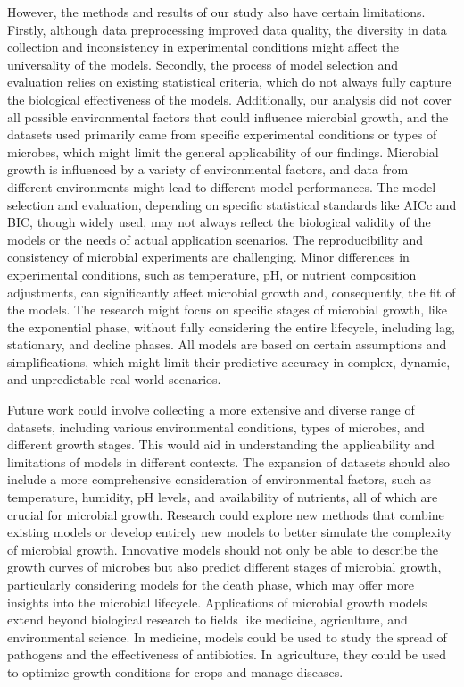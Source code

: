 \documentclass[11pt]{article}
\begin{document}
\begin{linenumbers}
However, the methods and results of our study also have certain limitations. Firstly, although data preprocessing improved data quality, the diversity in data collection and inconsistency in experimental conditions might affect the universality of the models. Secondly, the process of model selection and evaluation relies on existing statistical criteria, which do not always fully capture the biological effectiveness of the models. Additionally, our analysis did not cover all possible environmental factors that could influence microbial growth, and the datasets used primarily came from specific experimental conditions or types of microbes, which might limit the general applicability of our findings. Microbial growth is influenced by a variety of environmental factors, and data from different environments might lead to different model performances. The model selection and evaluation, depending on specific statistical standards like AICc and BIC, though widely used, may not always reflect the biological validity of the models or the needs of actual application scenarios. The reproducibility and consistency of microbial experiments are challenging. Minor differences in experimental conditions, such as temperature, pH, or nutrient composition adjustments, can significantly affect microbial growth and, consequently, the fit of the models. The research might focus on specific stages of microbial growth, like the exponential phase, without fully considering the entire lifecycle, including lag, stationary, and decline phases. All models are based on certain assumptions and simplifications, which might limit their predictive accuracy in complex, dynamic, and unpredictable real-world scenarios.

Future work could involve collecting a more extensive and diverse range of datasets, including various environmental conditions, types of microbes, and different growth stages. This would aid in understanding the applicability and limitations of models in different contexts. The expansion of datasets should also include a more comprehensive consideration of environmental factors, such as temperature, humidity, pH levels, and availability of nutrients, all of which are crucial for microbial growth. Research could explore new methods that combine existing models or develop entirely new models to better simulate the complexity of microbial growth. Innovative models should not only be able to describe the growth curves of microbes but also predict different stages of microbial growth, particularly considering models for the death phase, which may offer more insights into the microbial lifecycle. Applications of microbial growth models extend beyond biological research to fields like medicine, agriculture, and environmental science. In medicine, models could be used to study the spread of pathogens and the effectiveness of antibiotics. In agriculture, they could be used to optimize growth conditions for crops and manage diseases.


\end{linenumbers}
\end{document}

